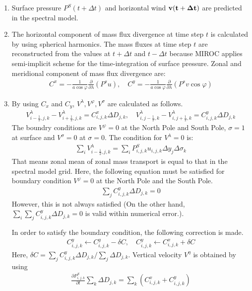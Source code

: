 \begin{enumerate}
\def\labelenumi{\arabic{enumi}.}
\item
  Surface pressure \(P^{S}(t+\Delta t)\) and horizontal wind \(\bf{v}(t+\Delta t)\) are predicted in the spectral model.
\item
  The horizontal component of mass flux divergence at time step \(t\) is calculated by using spherical harmonics. The mass fluxes at time step \(t\) are reconstructed from the values at \(t+\Delta t\)
  and \(t-\Delta t\) because MIROC applies semi-implicit scheme for the time-integration of surface pressure. Zonal and meridional component of mass flux divergence are:
  \begin{eqnarray}C^{x}=-\frac{1}{a \cos \varphi}\frac{\partial}{\partial \lambda}(P^{s}u),\quad C^{y}=-\frac{1}{a \cos \varphi}\frac{\partial}{\partial \lambda}(P^{s}v \cos \varphi)\end{eqnarray}
\item
  By using \(C_{x}\) and \(C_{y}\), \(V^{\lambda}, V^{\varphi}, V^{\sigma}\) are calculated as follows.
  \begin{eqnarray}V^{\lambda}_{i-\frac{1}{2},j,k}-V^{\lambda}_{i+\frac{1}{2},j,k}=C^{x}_{i,j,k}\Delta D_{j,k}, \quad V^{\lambda}_{i,j-\frac{1}{2},k}-V^{\lambda}_{i,j+\frac{1}{2},k}=C^{y}_{i,j,k}\Delta D_{j,k}\end{eqnarray} The
  boundry conditions are \(V^{\varphi}=0\) at the North Pole and South Pole, \(\sigma=1\) at surface and \(V^{\sigma}=0\) at \(\sigma=0\). The condition for \(V^{\lambda}=0\) is:
  \begin{eqnarray}\sum_{i}V^{\lambda}_{i-\frac{1}{2},j,k}=\sum_{i}P^{S}_{i,j,k}u_{i,j,k}\Delta y_{j}\Delta \sigma_{k}\end{eqnarray} That means zonal mean of zonal mass transport is equal to that in the spectral model grid.
  Here, the following equation must be satisfied for boundary condition \(V^{\varphi}=0\) at the North Pole and the South Pole. \begin{eqnarray}\sum_{j}C^{y}_{i,j,k}\Delta D_{j,k}=0\end{eqnarray} However, this is not always
  satisfied (On the other hand, \(\sum_{i} \sum_{j}C^{y}_{i,j,k}\Delta D_{j,k}=0\) is valid within numerical error.).

  In order to satisfy the boundary condition, the following correction is made. \begin{eqnarray}C^{y}_{i,j,k}\leftarrow C^{y}_{i,j,k}-\delta C, \quad C^{y}_{i,j,k}\leftarrow C^{x}_{i,j,k}+\delta C\end{eqnarray} Here,
  \(\delta C=\sum_{j}C^{y}_{i,j,k}\Delta D_{j,k}/\sum_{j}\Delta D_{j,k}\). Vertical velocity \(V^{\eta}\) is obtained by using \begin{eqnarray}
   \label{a2}
   \frac{\partial P^{S}_{i,j,k}}{\partial t}\sum_{k}\Delta D_{j,k}=\sum_{k}(C^{x}_{i,j,k}+C^{y}_{i,j,k})
   \end{eqnarray}


\end{enumerate}

